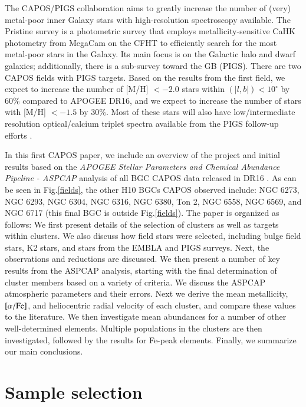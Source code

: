 \documentclass[onecolumn]{aa}
\begin{document}
The CAPOS/PIGS  collaboration aims to greatly increase the number of (very) metal-poor inner Galaxy stars with high-resolution spectroscopy available. The Pristine survey \citep{Starkenburg2017b} is a photometric survey that employs metallicity-sensitive CaHK photometry from MegaCam on the CFHT to efficiently search for the most metal-poor stars in the Galaxy. Its main focus is on the Galactic halo and dwarf galaxies; additionally, there is a sub-survey toward the GB (PIGS). 
There are two CAPOS fields with PIGS targets.
Based on the results from the first field, we expect to increase the number of [M/H] $< -2.0$ stars within $(|l, b|) < 10^\circ$ by 60\% compared to APOGEE DR16, and we expect to increase the number of stars with [M/H] $< -1.5$ by 30\%. 
Most of these stars will also have low/intermediate resolution optical/calcium triplet spectra available from the PIGS follow-up efforts \citep{Arentsen2020}. 

In this first CAPOS paper, we include an overview of the project and initial results based on the {\em APOGEE Stellar Parameters and Chemical Abundance Pipeline  - ASPCAP} \citep{GarciaPerez2016} analysis of all BGC CAPOS data released in DR16 \citep{DR16}. As can be seen in Fig.\ref{fields}, the other H10 BGCs CAPOS observed include:
NGC 6273, NGC 6293, NGC 6304, NGC 6316, 
NGC 6380, Ton 2, 
NGC 6558, NGC 6569, 
and NGC 6717 (this final BGC is outside Fig.\ref{fields}).
The paper is organized as follows: We first present details of the selection of clusters as well as targets within clusters. We also discuss how field stars were selected, including bulge field stars, K2 stars, and stars from the EMBLA and PIGS surveys. Next, the observations and reductions are discussed. We then present a number of key results from the ASPCAP analysis, starting with the final determination of cluster members based on a variety of criteria. We discuss the ASPCAP atmospheric parameters and their errors. Next we derive the mean metallicity, $[\alpha/{\rm Fe}]$, and heliocentric radial velocity of each cluster, and compare these values to the literature. We then investigate mean abundances for a number of other well-determined elements. Multiple populations in the clusters are then investigated, followed by the results for Fe-peak elements. Finally, we summarize our main conclusions.

\section{Sample selection}
\end{document}

